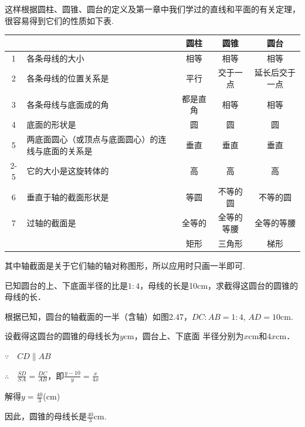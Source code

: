 这样根据圆柱、圆锥、圆台的定义及第一章中我们学过的直线和平面的有关定理，很容易得到它们的性质如下表.

\begin{center}
\begin{tabular}{c|p{}ccc}
\hline
&& 圆柱& 圆锥&圆台\\
\hline
1& 各条母线的大小&相等&相等&相等\\\hline
2&各条母线的位置关系是&平行&交于一点&延长后交于一点\\\hline
3&各条母线与底面成的角&都是直角&相等&相等\\\hline
4&底面的形状是&圆&圆&圆\\\hline
5&两底面圆心（或顶点与底面圆心）的连线与底面的关系是&垂直&垂直&垂直\\\cline{2-5}
&它的大小是这旋转体的&高&高&高\\\hline
6&垂直于轴的截面形状是&等圆&不等的圆&不等的圆\\\hline
7&过轴的截面是&全等的&全等的等腰&全等的等腰\\
& & 矩形 & 三角形 &梯形\\
\hline
\end{tabular}
\end{center}

其中轴截面是关于它们轴的轴对称图形，所以应用时只画一半即可.

\begin{example}
已知圆台的上、下底面半径的比是$1:4$，母线的长是10cm，求截得这圆台的圆锥的母线的长．

\end{example}

\noindent
\begin{minipage}{.6\textwidth}\CTEXindent
\begin{solution}
根据已知，圆台的轴截面的一半（含轴）如图2.47，$DC:AB=1:4$, $AD=10$cm.

设截得这圆台的圆锥的母线长为$y$cm，圆台上、下底面
半径分别为$x$cm和$4x$cm．

$\because\quad CD\parallel AB$

$\therefore\quad \frac{SD}{SA}=\frac{DC}{AB}$，即$\frac{y-10}{y}=\frac{x}{4x}$

解得$y=\frac{40}{3}$(cm)

因此，圆锥的母线长是$\frac{40}{3}$cm.
\end{solution}
\end{minipage}
\hfill
\begin{minipage}{.4\textwidth}
\centering
{}
\end{minipage}

